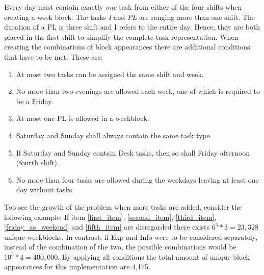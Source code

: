 Every day must contain exactly \textit{one} task from either of the four shifts when creating a week block. The tasks \textit{I} and \textit{PL} are ranging more than one shift. The duration of a PL is three shift and I refers to the entire day. Hence, they are both placed in the first shift to simplify the complete task representation. When creating the combinations of block appearances there are additional conditions that have to be met. These are:
\begin{enumerate}  
\item At most two tasks can be assigned the same shift and week.\label{first_item}
\item No more than two evenings are allowed each week, one of which is required to be a Friday. \label{second_item}
\item At most one PL is allowed in a weekblock. \label{third_item}
\item Saturday and Sunday shall always contain the same task type.\label{fourth_item}
\item If Saturday and Sunday contain Desk tasks, then so shall Friday afternoon (fourth shift). \label{friday_as_weekend}
\item No more than four tasks are allowed during the weekdays leaving at least one day without tasks. \label{fifth_item}
\end{enumerate}

Too see the growth of the problem when more tasks are added, consider the following example: If item \ref{first_item}, \ref{second_item}, \ref{third_item}, \ref{friday_as_weekend} and \ref{fifth_item} are disregarded there exists $6^5*3 = 23,328$ unique weekblocks. In contrast, if Exp and Info were to be considered separately, instead of the combination of the two, the possible combinations would be $10^5*4 = 400,000$.  By applying all conditions the total amount of unique block appearances for this implementation are 4,175. 

